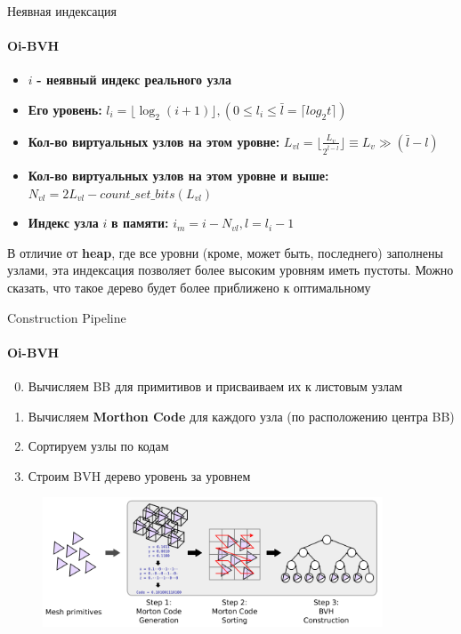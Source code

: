 \begin{frame}[t]{Неявная индексация}
    \framesubtitle{Oi-BVH}
    \begin{itemize}
        \item
            $i$ \textbf{- неявный индекс реального узла}
        \item
            \textbf{Его уровень:} $l_i = \lfloor \log_2 (i + 1) \rfloor, (0 \le l_i \le \bar{l} = \lceil log_2 t \rceil) $
        \item
            \textbf{Кол-во виртуальных узлов на этом уровне:}
            $L_{vl} = \lfloor \frac{L_v}{2^{\bar{l} - l}} \rfloor \equiv L_v \gg (\bar{l} - l)$
        \item
            \textbf{Кол-во виртуальных узлов на этом уровне и выше:}
            $N_{vl} = 2L_{vl} - count\_set\_bits(L_{vl})$
        \item
            \textbf{Индекс узла} $i$ \textbf{в памяти:}
            $i_m = i - N_{vl}, l = l_i - 1$
    \end{itemize}

    \begin{block}{}
        В отличие от \textbf{heap}, где все уровни (кроме, может быть, последнего) заполнены узлами, эта индексация позволяет
        более высоким уровням иметь пустоты. Можно сказать, что такое дерево будет более приближено к оптимальному
    \end{block}
\end{frame}

\begin{frame}[t]{Construction Pipeline}
    \framesubtitle{Oi-BVH}
    \begin{enumerate}
        \setcounter{enumi}{-1}
        \item
            Вычисляем BB для примитивов и присваиваем их к листовым узлам
        \item
            Вычисляем \textbf{Morthon Code} для каждого узла (по расположению центра BB)
        \item
            Сортируем узлы по кодам
        \item
            Строим BVH дерево уровень за уровнем
    \end{enumerate}
    \begin{figure}
        \begin{center}
            \includegraphics[width=0.9\textwidth]{res/boi_pipeline.png}
        \end{center}
    \end{figure}
\end{frame}

